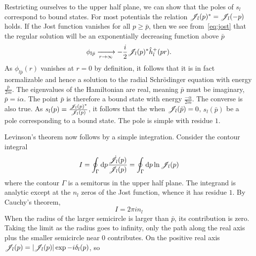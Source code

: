 Restricting ourselves to
the upper half plane, we can show that the poles of \(s_{l}\) correspond to
bound states. For most potentials the relation \(\mathscr{J}_{l}(p)^{*}=\mathscr{J}_{l}(-p)\) holds. If the Jost
function vanishes for all \(p\ge \bar{p}\), then we see from~\eqref{eq:jost} that
the regular solution will be an exponentially decreasing function above
\(\bar{p}\)
\begin{equation*}
  \phi_{l\bar{p}}\xrightarrow[r\to\infty]{}-\frac{i}{2}\mathscr{J}_{l}(p)^{*}\hat{h}^{+}_{l}(pr).
\end{equation*}
As \(\phi_{l\bar{p}}(r)\) vanishes at \(r=0\) by definition, it follows that it is in
fact normalizable and hence a solution to the radial Schr\"odinger equation with
energy \(\frac{\bar{p}}{2m}\). The eigenvalues
of the Hamiltonian are real,  meaning \(\bar{p}\) must be imaginary,
\(\bar{p}=i\alpha\). The point \(\bar{p}\) is therefore a bound state with
energy \(\frac{-\alpha}{2m}\). The converse is also true\cite[p.~224]{taylor}.
As \(s_{l}(p)=\frac{\mathscr{J}_{l}(p)^{*}}{\mathscr{J}_{l}(p)}\), it follows that the when
\(\mathscr{J}_{l}(\bar{p})=0\), \(s_{l}(\bar{p})\) be a pole corresponding to a bound
state. The pole is simple with residue \(1\).

Levinson's theorem now follows by a simple integration. Consider the
contour integral
\begin{equation*}
  I = \oint_{\Gamma} \dd p \frac{\dot{\mathscr{J}}_{l}(p)}{\mathscr{J}_{l}(p)} = \oint_{\Gamma} \dd p \ln\mathscr{J}_{l}(p)
\end{equation*}
where the contour \(\Gamma\) is a semitorus in the upper half plane. The
integrand is analytic except at the \(n_{l}\) zeros of the Jost function, whence it has
residue \(1\). By Cauchy's theorem,
\begin{equation*}
  I = 2\pi i n_{l}
\end{equation*}
When the radius of the larger semicircle is larger than \(\bar{p}\), its
contribution is zero. Taking the limit as the radius goes to infinity, only the
path along the real axis plus the smaller semicircle near \(0\) contributes. On
the positive real axis \(\mathscr{J}_{l}(p) = |\mathscr{J}_{l}(p)|\exp -i\delta_{l}(p)\), so

